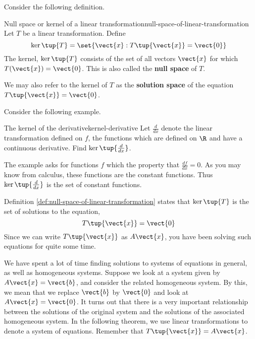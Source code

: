 Consider the following definition.

\begin{definition}{Null space or kernel of a linear transformation}{null-space-of-linear-transformation}
Let $T$ be a linear transformation. Define
\begin{equation*}
\ker \tup{T} = \set{\vect{x}:T \tup{\vect{x} }= \vect{0} } 
\end{equation*}
The kernel, $\ker \tup{T} $ consists of the set of all vectors $\vect{x}$ for which
$T (\vect{x}) = \vect{0}$. This is also called the
\textbf{null space} of $T$. 
\end{definition}

We may also refer to the kernel of $T$ as the
\textbf{solution space} of the equation $T \tup{\vect{x}} = \vect{0}$.


Consider the following example.

\begin{example}{The kernel of the derivative}{kernel-derivative}
Let $\frac{d}{dx}$ denote the linear transformation defined on $f$, the functions
which are defined on $\R$ and have a continuous derivative. Find 
$\ker \tup{\frac{d}{dx}} $.
\end{example}

\begin{solution} The example asks for functions $f$ which the property that $\frac{df}{dx}
=0. $ As you may know from calculus, these functions are the constant functions.
Thus $\ker \tup{\frac{d}{dx}}$ is the set of constant functions.
\end{solution} 

Definition \ref{def:null-space-of-linear-transformation} states that $\ker \tup{T} $ is the set of
solutions to the equation,
\begin{equation*}
T\tup{\vect{x} } = \vect{0}
\end{equation*}
Since we can write $T\tup{\vect{x} }$ as $A\vect{x}$, you have been solving such
equations for quite some time.

We have spent a lot of time finding solutions to systems of equations in general, as well as
homogeneous systems. Suppose we look at a system given by $A\vect{x}=\vect{b}$, and consider the 
related homogeneous system. By this, we mean that we replace $\vect{b}$ by $\vect{0}$ and look at $A\vect{x}=\vect{0}$. 
It turns out that there is a very important relationship between the solutions of the original
system and the solutions of the associated homogeneous system. In the following 
theorem, we use linear transformations to denote a system of equations. Remember that
$T\tup{\vect{x}} = A\vect{x}$.


